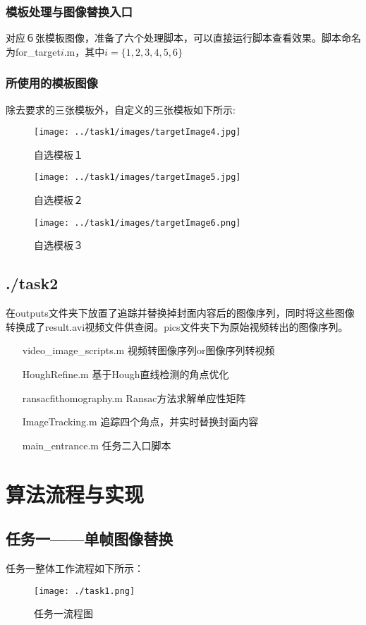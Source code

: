 \documentclass[UTF8]{ctexart}
\begin{document}
\subsubsection{模板处理与图像替换入口}
对应６张模板图像，准备了六个处理脚本，可以直接运行脚本查看效果。脚本命名为for\_target$i$.m，其中$i = \{1,2,3,4,5,6\}$

\subsubsection{所使用的模板图像}
除去要求的三张模板外，自定义的三张模板如下所示:
\begin{figure}[H]
    \centering
    \texttt{[image: ../task1/images/targetImage4.jpg]}
    \caption{自选模板１}
\end{figure}
\begin{figure}[H]
    \centering
    \texttt{[image: ../task1/images/targetImage5.jpg]}
    \caption{自选模板２}
\end{figure}
\begin{figure}[H]
    \centering
    \texttt{[image: ../task1/images/targetImage6.png]}
    \caption{自选模板３}
\end{figure}

\subsection{./task2}
在outputs文件夹下放置了追踪并替换掉封面内容后的图像序列，同时将这些图像转换成了result.avi视频文件供查阅。pics文件夹下为原始视频转出的图像序列。

\begin{itemize}
    \item[video\_image\_scripts.m]视频转图像序列or图像序列转视频
    \item[HoughRefine.m]基于Hough直线检测的角点优化
    \item[ransacfithomography.m]Ransac方法求解单应性矩阵
    \item[ImageTracking.m]追踪四个角点，并实时替换封面内容
    \item[main\_entrance.m]任务二入口脚本    
\end{itemize}


\section{算法流程与实现}
\subsection{任务一——单帧图像替换}
任务一整体工作流程如下所示：
\begin{figure}[H]
    \centering
    \texttt{[image: ./task1.png]}
    \caption{任务一流程图}
\end{figure}
\end{document}
